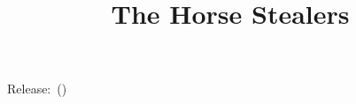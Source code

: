 \documentclass[10pt, a5paper, final, oneside]{memoir}
\title{The Horse Stealers}
\date{\DTMenglishmonthname{\DTMfetchmonth{gitdate}} \DTMfetchyear{gitdate}}
\begin{document}
\frontmatter
\maketitle
{\centering Release:\gitReln\ (\gitAbbrevHash)\\ }
\mainmatter



\backmatter
\end{document}
